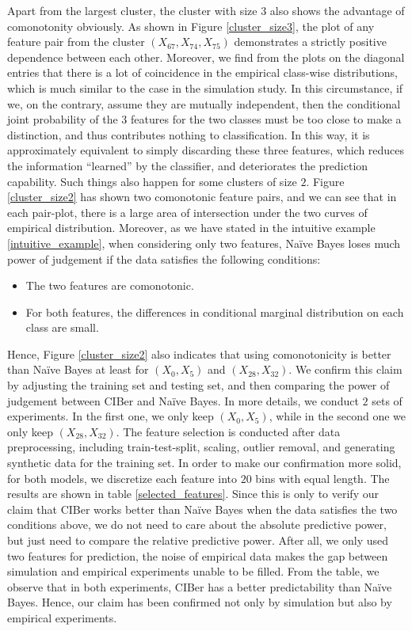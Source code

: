 \documentclass[twoside,11pt]{article}
\begin{document}
Apart from the largest cluster, the cluster with size $3$ also shows the advantage of comonotonity obviously. As shown in Figure \ref{cluster_size3}, the plot of any feature pair from the cluster $(X_{67}, X_{74}, X_{75})$ demonstrates a strictly positive dependence between each other. Moreover, we find from the plots on the diagonal entries that there is a lot of coincidence in the empirical class-wise distributions, which is much similar to the case in the simulation study. In this circumstance, if we, on the contrary, assume they are mutually independent, then the conditional joint probability of the $3$ features for the two classes must be too close to make a distinction, and thus contributes nothing to classification. In this way, it is approximately equivalent to simply discarding these three features, which reduces the information ``learned'' by the classifier, and deteriorates the prediction capability. Such things also happen for some clusters of size $2$. Figure \ref{cluster_size2} has shown two comonotonic feature pairs, and we can see that in each pair-plot, there is a large area of intersection under the two curves of empirical distribution. Moreover, as we have stated in the intuitive example \ref{intuitive_example}, when considering only two features, Na\"ive Bayes loses much power of judgement if the data satisfies the following conditions:
\begin{itemize}
    \item The two features are comonotonic.
    \item For both features, the differences in conditional marginal distribution on each class are small.
\end{itemize}
Hence, Figure \ref{cluster_size2} also indicates that using comonotonicity is better than Na\"ive Bayes at least for $(X_0, X_5)$ and $(X_{28}, X_{32})$. We confirm this claim by adjusting the training set and testing set, and then comparing the power of judgement between CIBer and Na\"ive Bayes. In more details, we conduct $2$ sets of experiments. In the first one, we only keep $(X_0, X_5)$, while in the second one we only keep $(X_{28}, X_{32})$. The feature selection is conducted after data preprocessing, including train-test-split, scaling, outlier removal, and generating synthetic data for the training set. In order to make our confirmation more solid, for both models, we discretize each feature into $20$ bins with equal length. The results are shown in table \ref{selected_features}. Since this is only to verify our claim that CIBer works better than Na\"ive Bayes when the data satisfies the two conditions above, we do not need to care about the absolute predictive power, but just need to compare the relative predictive power. After all, we only used two features for prediction, the noise of empirical data makes the gap between simulation and empirical experiments unable to be filled. From the table, we observe that in both experiments, CIBer has a better predictability than Na\"ive Bayes. Hence, our claim has been confirmed not only by simulation but also by empirical experiments.
\end{document}
